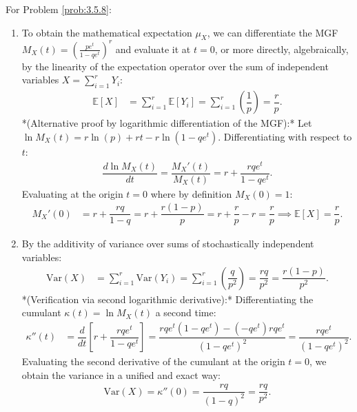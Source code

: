 \begin{solucion}
	\label{sol:3.5.8}
	For Problem \ref{prob:3.5.8}:
	\begin{enumerate}
		\item To obtain the mathematical expectation $\mu_X$, we can differentiate the MGF $M_X(t) = \left(\frac{p e^t}{1 - q e^t}\right)^r$ and evaluate it at $t=0$, or more directly, algebraically, by the linearity of the expectation operator over the sum of independent variables $X = \sum_{i=1}^r Y_i$:
		\begin{align*}
			\mathbb{E}[X] &= \sum_{i=1}^r \mathbb{E}[Y_i] = \sum_{i=1}^r \left(\dfrac{1}{p}\right) = \dfrac{r}{p}.
		\end{align*}
		*(Alternative proof by logarithmic differentiation of the MGF):* Let $\ln M_X(t) = r \ln(p) + r t - r \ln(1 - q e^t)$. Differentiating with respect to $t$:
		\begin{align*}
			\dfrac{d \ln M_X(t)}{dt} = \dfrac{M_X'(t)}{M_X(t)} = r + \dfrac{r q e^t}{1 - q e^t}.
		\end{align*}
		Evaluating at the origin $t = 0$ where by definition $M_X(0) = 1$:
		\begin{align*}
			M_X'(0) &= r + \dfrac{r q}{1 - q} = r + \dfrac{r(1-p)}{p} = r + \dfrac{r}{p} - r = \dfrac{r}{p} \implies \mathbb{E}[X] = \dfrac{r}{p}.
		\end{align*}
		\item By the additivity of variance over sums of stochastically independent variables:
		\begin{align*}
			\text{Var}(X) &= \sum_{i=1}^r \text{Var}(Y_i) = \sum_{i=1}^r \left(\dfrac{q}{p^2}\right) = \dfrac{r q}{p^2} = \dfrac{r(1-p)}{p^2}.
		\end{align*}
		*(Verification via second logarithmic derivative):* Differentiating the cumulant $\kappa(t) = \ln M_X(t)$ a second time:
		\begin{align*}
			\kappa''(t) &= \dfrac{d}{dt} \left[ r + \dfrac{r q e^t}{1 - q e^t} \right] = \dfrac{r q e^t (1 - q e^t) - (-q e^t) r q e^t}{(1 - q e^t)^2} = \dfrac{r q e^t}{(1 - q e^t)^2}.
		\end{align*}
		Evaluating the second derivative of the cumulant at the origin $t = 0$, we obtain the variance in a unified and exact way:
		\begin{align*}
			\text{Var}(X) = \kappa''(0) = \dfrac{r q}{(1 - q)^2} = \dfrac{r q}{p^2}.
		\end{align*}
	\end{enumerate}
\end{solucion}

